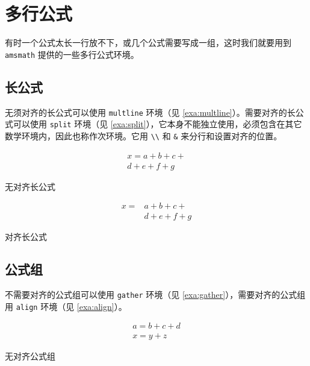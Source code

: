 \section{多行公式}

有时一个公式太长一行放不下，或几个公式需要写成一组，这时我们就要用到\texttt{amsmath} 提供的一些多行公式环境。

\subsection{长公式}
\label{sec:longeq}

无须对齐的长公式可以使用 \texttt{multline} 环境（见 \autoref{exa:multline}）。需要对齐的长公式可以使用 \texttt{split} 环境（见 \autoref{exa:split}），它本身不能独立使用，必须包含在其它数学环境内，因此也称作次环境。它用 \verb|\\| 和 \verb|&| 来分行和设置对齐的位置。

\begin{example}[h]
\begin{RLDemo}[]
\begin{multline}
x = a+b+c+{} \\
    d+e+f+g
\end{multline}
\end{RLDemo}
\caption{无对齐长公式}
\label{exa:multline}
\end{example}

\begin{example}[h]
\begin{RLDemo}[]
\[ \begin{split}
x ={} &a+b+c+{} \\
      &d+e+f+g
\end{split} \]
\end{RLDemo}
\caption{对齐长公式}
\label{exa:split}
\end{example}

\subsection{公式组}

不需要对齐的公式组可以使用 \texttt{gather} 环境（见 \autoref{exa:gather}），需要对齐的公式组用 \texttt{align} 环境（见 \autoref{exa:align}）。

\begin{example}[h]
\begin{RLDemo}[]
\begin{gather}
a = b+c+d \\
x = y+z
\end{gather}
\end{RLDemo}
\caption{无对齐公式组}
\label{exa:gather}
\end{example}

